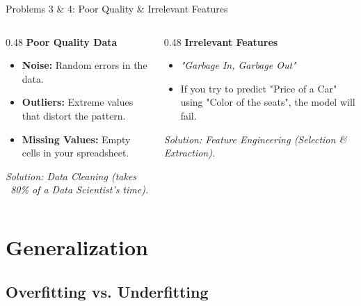 \begin{frame}{Problems 3 \& 4: Poor Quality \& Irrelevant Features}
    \begin{columns}[T]
        \begin{column}{0.48\textwidth}
            \textbf{Poor Quality Data}
            \begin{itemize}
                \item \textbf{Noise:} Random errors in the data.
                \item \textbf{Outliers:} Extreme values that distort the pattern.
                \item \textbf{Missing Values:} Empty cells in your spreadsheet.
            \end{itemize}
            \vspace{0.5em}
            \textit{Solution: Data Cleaning (takes ~80\% of a Data Scientist's time).}
        \end{column}
        \begin{column}{0.48\textwidth}
            \textbf{Irrelevant Features}
            \begin{itemize}
                \item \textit{"Garbage In, Garbage Out"}
                \item If you try to predict "Price of a Car" using "Color of the seats", the model will fail.
            \end{itemize}
            \vspace{0.5em}
            \textit{Solution: Feature Engineering (Selection \& Extraction).}
        \end{column}
    \end{columns}
\end{frame}

\section{Generalization}
\subsection{Overfitting vs. Underfitting}

